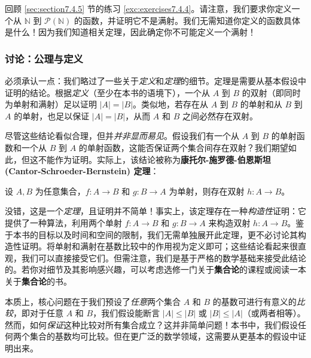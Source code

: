 回顾 \ref{sec:section7.4.5} 节的练习 \ref{exc:exercises7.4.4}。请注意，我们要求你定义一个从 $\mathbb{N}$ 到 $\mathcal{P}(\mathbb{N})$ 的函数，并证明它不是满射。我们无需知道你定义的函数具体是什么！因为我们知道相关定理，因此确定你不可能定义一个满射！

\subsubsection*{讨论：公理与定义}

必须承认一点：我们略过了一些关于\emph{定义}和\emph{定理}的细节。定理是需要从基本假设中证明的结论。根据\emph{定义}（至少在本书的语境下），一个从 $A$ 到 $B$ 的双射（即同时为单射和满射）足以证明 $|A| = |B|$。类似地，若存在从 $A$ 到 $B$ 的单射和从 $B$ 到 $A$ 的单射，也足以保证 $|A| = |B|$，从而 $A$ 和 $B$ 之间必然存在双射。

尽管这些结论看似合理，但并\emph{并非显而易见}。假设我们有一个从 $A$ 到 $B$ 的单射函数和一个从 $B$ 到 $A$ 的单射函数，这能否保证两个集合间存在双射？我们期望如此，但这不能作为证明。实际上，该结论被称为\textbf{康托尔-施罗德-伯恩斯坦 (Cantor-Schroeder-Bernstein) 定理}：

\begin{theorem}
    设 $A,B$ 为任意集合，$f : A \to B$ 和 $g : B \to A$ 为单射，则存在双射 $h : A \to B$。
\end{theorem}

没错，这是一个\emph{定理}，且证明并不简单！事实上，该定理存在一种\emph{构造性}证明：它提供了一种算法，利用两个单射 $f : A \to B$ 和 $g : B \to A$ 来构造双射 $h : A \to B$。鉴于本书的目标以及时间和空间的限制，我们无需单独展开此定理，更不必讨论其构造性证明。将单射和满射在基数比较中的作用视为定义即可；这些结论看起来很直观，我们可以直接接受它们。但需注意，我们是基于严格的数学基础来接受此结论的。若你对细节及其影响感兴趣，可以考虑选修一门关于\textbf{集合论}的课程或阅读一本关于\textbf{集合论}的书。

本质上，核心问题在于我们预设了\emph{任意}两个集合 $A$ 和 $B$ 的基数可进行有意义的\emph{比较}，即对于任意 $A$ 和 $B$，我们假设能断言 $|A| \le |B|$ 或 $|B| \le |A|$（或两者相等）。然而，如何\emph{保证}这种比较对所有集合成立？这并非简单问题！本书中，我们假设任何两个集合的基数均可比较。但在更广泛的数学领域，这需要从更基本的假设中证明出来。
